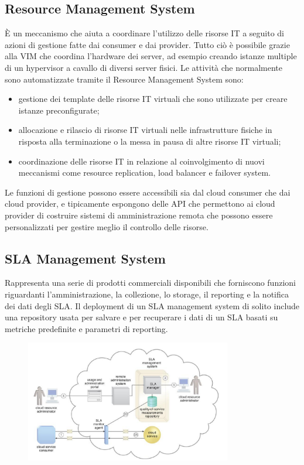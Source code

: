 \subsection{Resource Management System}
È un meccanismo che aiuta a coordinare l'utilizzo delle risorse IT a seguito di azioni di gestione fatte dai consumer e dai provider. Tutto ciò è possibile grazie alla VIM che coordina l'hardware dei server, ad esempio creando istanze multiple di un hypervisor a cavallo di diversi server fisici. Le attività che normalmente sono automatizzate tramite il Resource Management System sono:
\begin{itemize}
    \item gestione dei template delle risorse IT virtuali che sono utilizzate per creare istanze preconfigurate;
    \item allocazione e rilascio di risorse IT virtuali nelle infrastrutture fisiche in risposta alla terminazione o la messa in pausa di altre risorse IT virtuali;
    \item coordinazione delle risorse IT in relazione al coinvolgimento di nuovi meccanismi come resource replication, load balancer e failover system.
\end{itemize}
Le funzioni di gestione possono essere accessibili sia dal cloud consumer che dai cloud provider, e tipicamente espongono delle API che permettono ai cloud provider di costruire sistemi di amministrazione remota che possono essere personalizzati per gestire meglio il controllo delle risorse.

\subsection{SLA Management System}
Rappresenta una serie di prodotti commerciali disponibili che forniscono funzioni riguardanti l'amministrazione, la collezione, lo storage, il reporting e la notifica dei dati degli SLA. Il deployment di un SLA management system di solito include una repository usata per salvare e per recuperare i dati di un SLA basati su metriche predefinite e parametri di reporting.

\begin{figure}[htb!]
    \centering
    \includegraphics[width=9cm]{./Images/cap10/10.2.png}
\end{figure}
\clearpage

